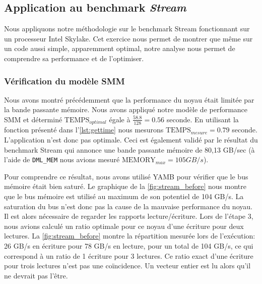 \subsection{Application au benchmark \textit{Stream}}

    Nous appliquons notre méthodologie sur le benchmark Stream fonctionnant sur un processeur Intel Skylake. Cet exercice nous permet de montrer que même sur un code aussi simple, apparemment optimal, notre analyse nous permet de comprendre sa performance et de l'optimiser.
    
        
    \subsubsection{Vérification du modèle SMM}
    
        Nous avons montré précédemment que la performance du noyau était limitée par la bande passante mémoire. Nous avons appliqué notre modèle de performance SMM et déterminé $\text{TEMPS}_{optimal}$ égale à $\frac{58.8}{128} = 0.56$ seconde. En utilisant la fonction présenté dans l'\autoref{lst:gettime} nous mesurons $\text{TEMPS}_{mesure} = 0.79$ seconde.
        L'application n'est donc pas optimale. Ceci est également validé par le résultat du benchmark Stream qui annonce une bande passante mémoire de 80,13 GB/sec (à l'aide de \verb=DML_MEM= nous avions mesuré $\text{MEMORY}_{max} = 105 GB/s$).
        
        Pour comprendre ce résultat, nous avons utilisé YAMB pour vérifier que le bus mémoire était bien saturé. Le graphique de la \autoref{fig:stream_before} nous montre que le bus mémoire est utilisé au maximum de son potentiel de 104 GB/s. La saturation du bus n'est donc pas la cause de la mauvaise performance du noyau. Il est alors nécessaire de regarder les rapports lecture/écriture. Lors de l'étape 3, nous avions calculé un ratio optimale pour ce noyau  d'une écriture pour deux lectures. La \autoref{fig:stream_before} montre la répartition mesurée lors de l'exécution: 26 GB/s en écriture pour 78 GB/s en lecture, pour un total de 104 GB/s, ce qui correspond à un ratio de 1 écriture pour 3 lectures. Ce ratio exact d'une écriture pour trois lectures n'est pas une coïncidence. Un vecteur entier est lu alors qu'il ne devrait pas l'être.
        

